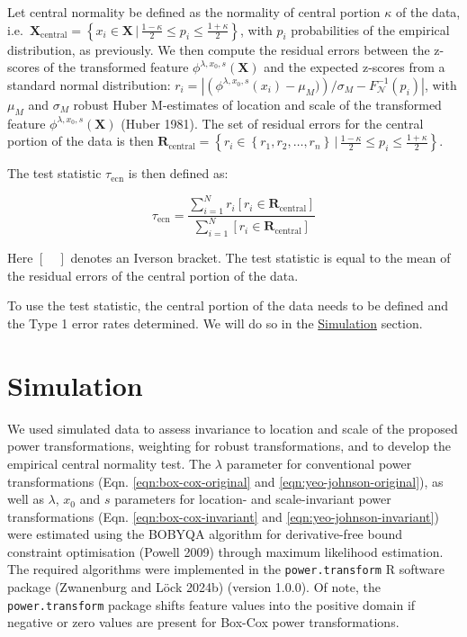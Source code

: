 \documentclass[
  a4paper,
]{article}
\begin{document}
Let central normality be defined as the normality of central portion
\(\kappa\) of the data,
i.e.~\(\mathbf{X}_{\text{central}} = \left\{x_i \in \mathbf{X} \, | \,  \frac{1-\kappa}{2} \leq  p_i \leq \frac{1 + \kappa}{2}\right\}\),
with \(p_i\) probabilities of the empirical distribution, as previously.
We then compute the residual errors between the z-scores of the
transformed feature \(\phi^{\lambda, x_0, s} (\mathbf{X})\) and the
expected z-scores from a standard normal distribution:
\(r_i =\left| \left( \phi^{\lambda, x_0, s}(x_i) - \mu_M)\right) / \sigma_M - F^{-1}_{\mathcal{N}}(p_i) \right|\),
with \(\mu_M\) and \(\sigma_M\) robust Huber M-estimates of location and
scale of the transformed feature \(\phi^{\lambda, x_0, s} (\mathbf{X})\)
(Huber 1981). The set of residual errors for the central portion of the
data is then
\(\mathbf{R}_{\text{central}} = \left\{ r_i \in \left\{ r_1, r_2, \ldots, r_n\right\} \, | \,  \frac{1-\kappa}{2} \leq  p_i \leq \frac{1 + \kappa}{2}\right\}\).

The test statistic \(\tau_{\text{ecn}}\) is then defined as:

\begin{equation}
\tau_{\text{ecn}} = \frac{\sum_{i=1}^{N} r_i \left[r_i \in \mathbf{R}_{\text{central}}\right]}{\sum_{i=1}^N \left[r_i \in \mathbf{R}_{\text{central}}\right]} 
\end{equation}

Here \([\quad]\) denotes an Iverson bracket. The test statistic is equal
to the mean of the residual errors of the central portion of the data.

To use the test statistic, the central portion of the data needs to be
defined and the Type 1 error rates determined. We will do so in the
\hyperref[simulation]{Simulation} section.

\section{Simulation}\label{simulation}

We used simulated data to assess invariance to location and scale of the
proposed power transformations, weighting for robust transformations,
and to develop the empirical central normality test. The \(\lambda\)
parameter for conventional power transformations (Eqn.
\ref{eqn:box-cox-original} and \ref{eqn:yeo-johnson-original}), as well
as \(\lambda\), \(x_0\) and \(s\) parameters for location- and
scale-invariant power transformations (Eqn. \ref{eqn:box-cox-invariant}
and \ref{eqn:yeo-johnson-invariant}) were estimated using the BOBYQA
algorithm for derivative-free bound constraint optimisation (Powell
2009) through maximum likelihood estimation. The required algorithms
were implemented in the \texttt{power.transform} R software package
(Zwanenburg and Löck 2024b) (version 1.0.0). Of note, the
\texttt{power.transform} package shifts feature values into the positive
domain if negative or zero values are present for Box-Cox power
transformations.
\end{document}
